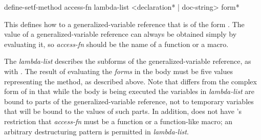 \begin{defmac}
define-setf-method access-fn lambda-list <{declaration}* | doc-string> {form}*

This defines how
to  a generalized-variable reference that is of the form
.  The value of a generalized-variable reference can
always be obtained simply by evaluating it, so \emph{access-fn} should be the
name of a function or a macro.

The \emph{lambda-list} describes the subforms of the generalized-variable
reference, as with .  The result of evaluating the
\emph{forms} in the body must be five values representing
the  method, as described
above.  Note that  differs from the complex form of
 in that while the body is being executed the variables in
\emph{lambda-list} are bound to parts of the generalized-variable reference,
not to temporary variables that will be bound to the values of such parts.
In addition,  does not have 's
restriction that \emph{access-fn} must be a function or a function-like
macro; an arbitrary  destructuring pattern is permitted in
\emph{lambda-list}.


\end{defmac}
